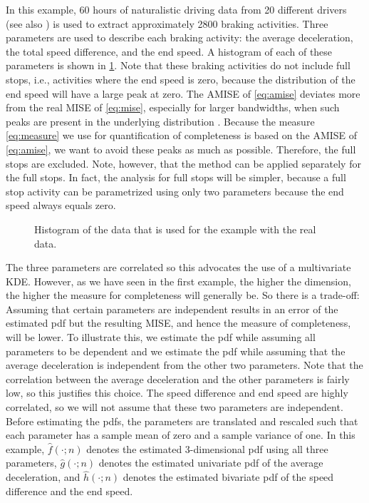 In this example, 60 hours of naturalistic driving data from 20 different drivers (see also \textcite{deGelder2017assessment}) is used to extract approximately 2800 braking activities. Three parameters are used to describe each braking activity: the average deceleration, the total speed difference, and the end speed. A histogram of each of these parameters is shown in \cref{fig:histogram}. Note that these braking activities do not include full stops, i.e., activities where the end speed is zero, because the distribution of the end speed will have a large peak at zero. The AMISE of \cref{eq:amise} deviates more from the real MISE of \cref{eq:mise}, especially for larger bandwidths, when such peaks are present in the underlying distribution \cite{marron1992exact}. Because the measure \cref{eq:measure} we use for quantification of completeness is based on the AMISE of \cref{eq:amise}, we want to avoid these peaks as much as possible. Therefore, the full stops are excluded.
\cstart
Note, however, that the method can be applied separately for the full stops. In fact, the analysis for full stops will be simpler, because a full stop activity can be parametrized using only two parameters because the end speed always equals zero. 
\cend

\setlength{}
\setlength{}
\begin{figure}
	\centering
	
	\caption{Histogram of the data that is used for the example with the real data.}
	\label{fig:histogram}
\end{figure}

The three parameters are correlated so this advocates the use of a multivariate KDE. However, as we have seen in the first example, the higher the dimension, the higher the measure for completeness will generally be. So there is a trade-off: Assuming that certain parameters are independent results in an error of the estimated pdf but the resulting MISE, and hence the measure of completeness, will be lower. To illustrate this, we estimate the pdf while assuming all parameters to be dependent and we estimate the pdf while assuming that the average deceleration is independent from the other two parameters. Note that the correlation between the average deceleration and the other parameters is fairly low, so this justifies this choice. The speed difference and end speed are highly correlated, so we will not assume that these two parameters are independent. Before estimating the pdfs, the parameters are translated and rescaled such that each parameter has a sample mean of zero and a sample variance of one. In this example, $\hat{f}(\cdot;n)$ denotes the estimated 3-dimensional pdf using all three parameters, $\hat{g}(\cdot;n)$ denotes the estimated univariate pdf of the average deceleration, and $\hat{h}(\cdot;n)$ denotes the estimated bivariate pdf of the speed difference and the end speed.

